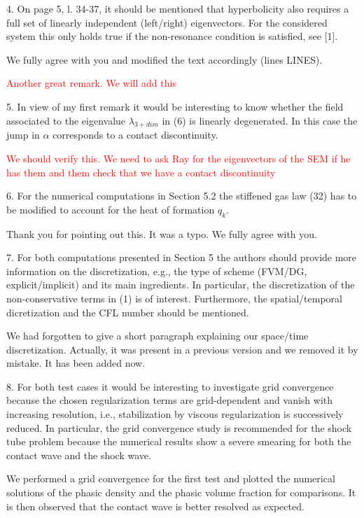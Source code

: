 \documentclass{article}
\newcommand{\tcr}[1]{\textcolor{red}{#1}}
\begin{document}
{\color{blue}
4. On page 5, l. 34-37, it should be mentioned that hyperbolicity also requires a full
set of linearly independent (left/right) eigenvectors. For the considered system this
only holds true if the non-resonance condition is satisfied, see [1].
}

We fully agree with you and modified the text accordingly (lines LINES).

\tcr{Another great remark. We will add this}
\bigskip


{\color{blue}
5. In view of my first remark it would be interesting to know whether the field associated
to the eigenvalue $\lambda_{3+dim}$ in (6) is linearly degenerated. In this case the jump in $\alpha$
corresponds to a contact discontinuity.
}

\tcr{We should verify this. We need to ask Ray for the eigenvectors of the SEM if he has them and them check that
we have a contact discontinuity}
\bigskip


{\color{blue}
6. For the numerical computations in Section 5.2 the stiffened gas law (32) has to be
modified to account for the heat of formation $q_k$.}

Thank you for pointing out this. It was a typo. We fully agree with you.
\bigskip


{\color{blue}
7. For both computations presented in Section 5 the authors should provide more 
information on the discretization, e.g., the type of scheme (FVM/DG, explicit/implicit)
and its main ingredients. In particular, the discretization of the non-conservative
terms in (1) is of interest. Furthermore, the spatial/temporal dicretization and the
CFL number should be mentioned.}

We had forgotten to give a short paragraph explaining our space/time discretization.
Actually, it was present in a previous version and we removed it by mistake. It has 
been added now.
\bigskip


{\color{blue}
8. For both test cases it would be interesting to investigate grid convergence because the
chosen regularization terms are grid-dependent and vanish with increasing resolution,
i.e., stabilization by viscous regularization is successively reduced. In particular, the
grid convergence study is recommended for the shock tube problem because the
numerical results show a severe smearing for both the contact wave and the shock
wave.}

We performed a grid convergence for the first test and plotted the numerical solutions of the phasic density and
the phasic volume fraction for comparisons. It is then observed that the contact wave is better resolved as expected. 
\end{document}
